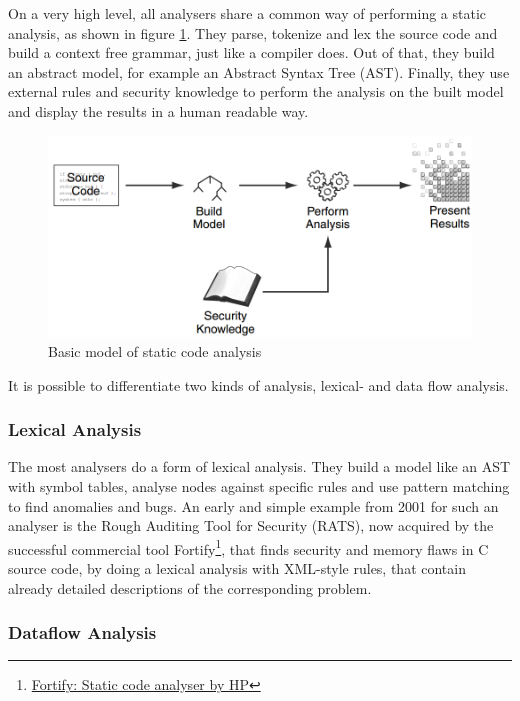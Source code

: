 \documentclass[conference]{IEEEtran}
\begin{document}
On a very high level, all analysers share a common way of performing a static analysis, as shown in figure \ref{fig:analysis}.
They parse, tokenize and lex the source code and build a context free grammar, just like a compiler does.
Out of that, they build an abstract model, for example an Abstract Syntax Tree (AST).
Finally, they use external rules and security knowledge to perform the analysis on the built model and display the results in a human readable way.

\begin{figure}[!t]
	\centering
	\includegraphics[width=1\linewidth]{img/analysis.png}
	\caption{Basic model of static code analysis \cite{Static_code_analysis_book_Chess:2007}}
	\label{fig:analysis}
\end{figure}

It is possible to differentiate two kinds of analysis, lexical- and data flow analysis.


\subsubsection{Lexical Analysis}
\label{subsubsec:lex_analysis}


The most analysers do a form of lexical analysis.
They build a model like an AST with symbol tables, analyse nodes against specific rules and use pattern matching to find anomalies and bugs.
An early and simple example from 2001 for such an analyser is the Rough Auditing Tool for Security (RATS)\cite{Static_code_analysis_book_Chess:2007}, now acquired by the successful commercial tool Fortify\footnote{\href{http://www8.hp.com/de/de/software-solutions/application-security/}{Fortify: Static code analyser by HP}}, that finds security and memory flaws in C source code, by doing a lexical analysis with XML-style rules, that contain already detailed descriptions of the corresponding problem.


\subsubsection{Dataflow Analysis}
\label{subsubsec:dataflow_analysis}
\end{document}
